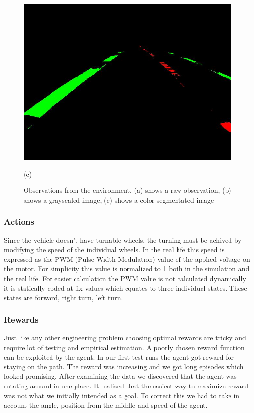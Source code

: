 \documentclass{article}
\begin{document}
\begin{figure}[H]
\begin{minipage}{.3\textwidth}
	\end{minipage}%
\begin{minipage}{.3\textwidth}
	\centering
	\includegraphics[width=0.8\linewidth]{colorseg.jpg}
	\caption{(c)}
\end{minipage}
\caption{Observations from the environment. (a) shows a raw observation, (b) shows a grayscaled image, (c) shows a color segmentated image}
\end{figure}

\subsubsection{\normalsize{Actions}}
\label{sec:actions}
Since the vehicle doesn't have turnable wheels, the turning must be achived by modifying the speed of the individual wheels. In the real life this speed is expressed as the PWM (Pulse Width Modulation) value of the applied voltage on the motor. For simplicity this value is normalized to 1 both in the simulation and the real life. For easier calculation the PWM value is not calculated dynamically it is statically coded at fix values which equates to three individual states. 
These states are forward, right turn, left turn.

\subsubsection{\normalsize{Rewards}}
\label{sec:rewards}
Just like any other engineering problem choosing optimal rewards are tricky and require lot of testing and empirical estimation. A poorly chosen reward function can be exploited by the agent. In our first test runs the agent got reward for staying on the path. The reward was increasing and we got long episodes which looked promising. After examining the data we discovered that the agent was rotating around in one place. 
It realized that the easiest way to maximize reward was not what we initially intended as a goal. To correct this we had to take in account the angle, position from the middle and speed of the agent.
\end{document}
